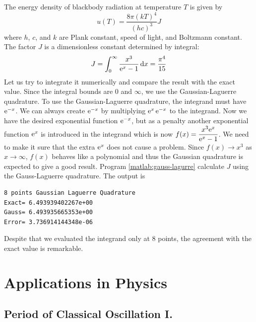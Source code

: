 \begin{example}
\label{ex:blackbody}
The energy density of blackbody radiation at temperature $T$ is given by
\begin{equation}
u(T) = \frac{8 \pi (k T)^4}{(h c)^3} J
\end{equation}
where $h$, $c$, and $k$ are Plank constant\cite{Griffiths}, speed of light, and Boltzmann constant\cite{Blundell}.
The factor $J$ is a dimensionless constant determined by integral:
\begin{equation}
J = \int_0^\infty \frac{x^3}{\text{e}^x  - 1} \dd{x} = \frac{\pi^4}{15}
\end{equation}
Let us try to integrate it numerically and compare the result with the exact value.  Since the integral bounds are 0 and $\infty$, we use the Gaussian-Laguerre quadrature.
To use the Gaussian-Laguerre quadrature, the integrand must have $\text{e}^{-x}$. We can always create $\text{e}^{-x}$ by multiplying $\text{e}^{x}\, \text{e}^{-x}$ to the integrand. Now we have the desired exponential function $\text{e}^{-x}$, but as a penalty another exponential function $\text{e}^{x}$ is introduced in the integrand which is now $f(x)=\displaystyle\frac{x^3 \text{e}^{x}}{\text{e}^{x}-1}$.   We need to make it sure that the extra $\text{e}^x$ does not cause a problem.  Since $f(x) \rightarrow x^3$ as $x \rightarrow \infty$, $f(x)$ behaves like a polynomial and thus the Gaussian quadrature is expected to give a good result.  Program \ref{matlab:gauss-lagurre} calculate $J$ using the Gauss-Laguerre quadrature.  The output is 

\begin{mybox}
\small
\begin{verbatim}
8 points Gaussian Laguerre Quadrature
Exact= 6.493939402267e+00
Gauss= 6.493935665353e+00 
Error= 3.736914144348e-06
\end{verbatim}
\normalsize
\end{mybox}

\medskip
\noindent
Despite that we evaluated the integrand only at 8 points, the agreement with the exact value is remarkable.

\end{example}

\noindent
\section{Applications in Physics}


\bigskip
\subsection{Period of Classical Oscillation I.}\label{sec:oscillation1}


